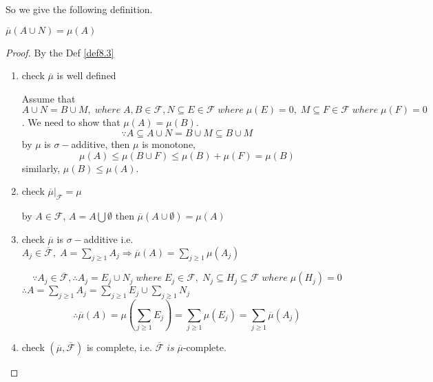 So we give the following definition.

\begin{definition}
	$\overline \mu  \left( {A \cup N} \right) = \mu \left( A \right)$
	\label{def8.3}
\end{definition}

\begin{proof}
	By the Def \ref{def8.3}
	\begin{enumerate}
		\item check $\overline \mu$ is well defined
		
		Assume that $A \cup N = B \cup M,\;where\;A,B \in \mathcal{F},N \subseteq E \in \mathcal{F}\;where\;\mu \left( E \right) = 0,\;M \subseteq F \in \mathcal{F}\;where\;\mu \left( F \right) = 0$. We need to show that $\mu \left( A \right) = \mu \left( B \right)$.
		\begin{equation}
		\because A \subseteq A \cup N = B \cup M \subseteq B \cup M
		\label{eq8.4}
		\end{equation}
		by $ \mu $ is $ \sigma- $additive, then $ \mu $ is monotone,
		\begin{equation}
		\mu \left( A \right) \leqslant \mu \left( {B \cup F} \right) \leqslant \mu \left( B \right) + \mu \left( F \right) = \mu \left( B \right)
		\label{eq8.5}
		\end{equation}
		similarly, $\mu \left( B \right) \leqslant \mu \left( A \right)$.
		\item check $\overline \mu  {|_{\mathcal{F}}} = \mu $
		
		by $ A \in \mathcal{F} $, $ A = A \bigcup \emptyset $ then $\overline \mu  \left( {A \cup \emptyset } \right) = \mu \left( A \right)$
		\item check $\overline \mu  $ is $ \sigma- $additive i.e. ${A_j} \in \overline {\mathcal{F}} ,\;A = \sum\limits_{j \geqslant 1} {{A_j}} \Rightarrow \overline \mu  \left( A \right) = \sum\limits_{j \geqslant 1} {\mu \left( {{A_j}} \right)} $
		
		\begin{equation}
		\because {A_j} \in \overline {\mathcal{F}} ,\therefore {A_j} = {E_j} \cup {N_j}\;where\;{E_j} \in \mathcal{F},\;{N_j} \subseteq {H_j} \subseteq \mathcal{F}\;where\;\mu \left( {{H_j}} \right) = 0
		\label{eq8.6}
		\end{equation}
		$ \therefore A = \sum\limits_{j \geqslant 1} {{A_j}}  = \sum\limits_{j \geqslant 1} {{E_j}}  \cup \sum\limits_{j \geqslant 1} {{N_j}} $
		\begin{equation}
		\therefore \overline \mu  \left( A \right) = \mu \left( {\sum\limits_{j \geqslant 1} {{E_j}} } \right) = \sum\limits_{j \geqslant 1} {\mu \left( {{E_j}} \right)}  = \sum\limits_{j \geqslant 1} {\overline \mu  \left( {{A_j}} \right)} 
		\label{eq8.7}
		\end{equation}
		\item check $\left( {\overline \mu  ,\overline {\mathcal{F}} } \right)$ is complete, i.e. $\overline {\mathcal{F}} \;is\;\overline \mu  $-complete.
		

\end{enumerate}
\end{proof}
